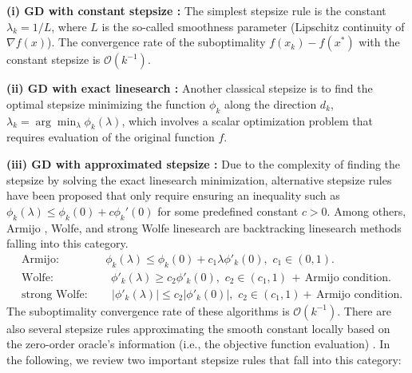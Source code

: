 \documentclass[11pt, a4paper, oneside, reqno]{amsart}
\begin{document}
\textbf{(i) GD with constant stepsize \cite{Nocedal2006}:} The simplest stepsize rule is the constant $\lambda_k = 1/{L}$, where $L$ is the so-called smoothness parameter (Lipschitz continuity of $\nabla f(x)$). The convergence rate of the suboptimality $f(x_k) - f(x^*)$ with the constant stepsize is $\mathcal{O}(k^{-1})$.

\textbf{(ii) GD with exact linesearch \cite{Nocedal2006}:} Another classical stepsize is to find the optimal stepsize minimizing the function $\phi_k$ along the direction $d_k$, $\lambda_k = \arg \min_{\lambda} \phi_k(\lambda)$, which involves a scalar optimization problem that requires evaluation of the original function $f$.

\textbf{(iii) GD with approximated stepsize \cite{Nocedal2006}:} Due to the complexity of finding the stepsize by solving the exact linesearch minimization, alternative stepsize rules have been proposed that only require ensuring an inequality such as $\phi_k(\lambda) \leq \phi_k(0) + c \phi_k '(0)$ for some predefined constant $c > 0$. Among others, Armijo \cite{Armijo1966}, Wolfe, and strong Wolfe linesearch \cite{Nocedal2006} are backtracking linesearch methods falling into this category. 
    \begin{subequations}\label{backtracking linesearch}
    \begin{align}
        & \text{Armijo}: \qquad\qquad \phi_k(\lambda) \leq \phi_k(0) + c_1 \lambda \phi '_k(0), \,\, c_1 \in (0,1). \label{Armijo-rule}\\
        & \text{Wolfe}: \qquad\qquad\quad \phi'_k(\lambda) \geq c_2 \phi'_k(0), \,\, c_2 \in (c_1, 1) \, + \,\text{Armijo condition}. \label{Wolfe-rule}\\
        & \text{strong Wolfe}: \qquad |\phi'_k(\lambda)| \leq c_2 |\phi'_k(0)|, \,\, c_2 \in (c_1, 1) + \,\text{Armijo condition}. \label{strong-Wolfe-rule}
    \end{align}
    \end{subequations}
The suboptimality convergence rate of these algorithms is $\mathcal{O}(k^{-1})$. There are also several stepsize rules approximating the smooth constant locally based on the zero-order oracle's information (i.e., the objective function evaluation) \cite{poliak1987introduction, Malitsky2020, barre2019polyak, barre2020complexity}. In the following, we review two important stepsize rules that fall into this category:
\end{document}
